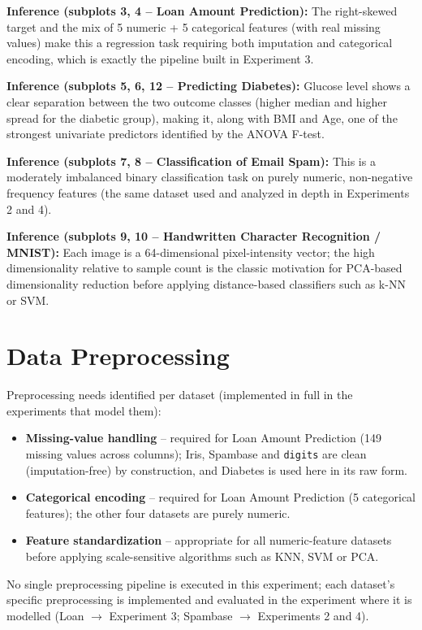 \documentclass[12pt,a4paper]{article}
\begin{document}
\textbf{Inference (subplots 3, 4 -- Loan Amount Prediction):} The right-skewed target and
the mix of 5 numeric + 5 categorical features (with real missing values) make this a
regression task requiring both imputation and categorical encoding, which is exactly the
pipeline built in Experiment 3.

\textbf{Inference (subplots 5, 6, 12 -- Predicting Diabetes):} Glucose level shows a
clear separation between the two outcome classes (higher median and higher spread for
the diabetic group), making it, along with BMI and Age, one of the strongest univariate
predictors identified by the ANOVA F-test.

\textbf{Inference (subplots 7, 8 -- Classification of Email Spam):} This is a moderately
imbalanced binary classification task on purely numeric, non-negative frequency features
(the same dataset used and analyzed in depth in Experiments 2 and 4).

\textbf{Inference (subplots 9, 10 -- Handwritten Character Recognition / MNIST):} Each
image is a 64-dimensional pixel-intensity vector; the high dimensionality relative to
sample count is the classic motivation for PCA-based dimensionality reduction before
applying distance-based classifiers such as k-NN or SVM.

\section{Data Preprocessing}
Preprocessing needs identified per dataset (implemented in full in the experiments that
model them):
\begin{itemize}
\item \textbf{Missing-value handling} -- required for Loan Amount Prediction (149 missing
values across columns); Iris, Spambase and \texttt{digits} are clean (imputation-free) by
construction, and Diabetes is used here in its raw form.
\item \textbf{Categorical encoding} -- required for Loan Amount Prediction (5 categorical
features); the other four datasets are purely numeric.
\item \textbf{Feature standardization} -- appropriate for all numeric-feature datasets
before applying scale-sensitive algorithms such as KNN, SVM or PCA.
\end{itemize}
No single preprocessing pipeline is executed in this experiment; each dataset's specific
preprocessing is implemented and evaluated in the experiment where it is modelled (Loan
$\to$ Experiment 3; Spambase $\to$ Experiments 2 and 4).
\end{document}
